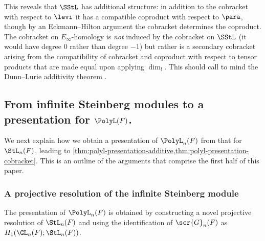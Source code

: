 \documentclass[a4paper]{amsart}
\begin{document}
This reveals that $\SStL$ has additional structure: in addition to the cobracket with respect to $\levi$ it has a compatible coproduct with respect to $\para$, though by an Eckmann--Hilton argument the cobracket determines the coproduct. The cobracket on $E_\infty$-homology is \emph{not} induced by the cobracket on $\SStL$ (it would have degree $0$ rather than degree $-1$) but rather is a secondary cobracket arising from the compatibility of cobracket and coproduct with respect to tensor products that are made equal upon applying $\dim_!$. This should call to mind the Dunn--Lurie additivity theorem \cite[5.1.2.2]{LurieHA}.

\subsection{From infinite Steinberg modules to a presentation for $\PolyL(F)$.} \label{sec:intro-presentation} 
We next explain how we obtain a presentation of $\PolyL_n(F)$ from that for $\StL_n(F)$, leading to \cref{thm:polyl-presentation-additive,thm:polyl-presentation-cobracket}. This is an outline of the arguments that comprise the first half of this paper.

\subsubsection{A projective resolution of the infinite Steinberg module} \label{sec:intro-presentation-resolution} The presentation of $\PolyL_n(F)$ is obtained by constructing a novel projective resolution of $\StL_n(F)$ and using the identification of $\scr{G}_n(F)$ as $H_1(\GL_n(F);\StL_n(F))$. 
\end{document}
